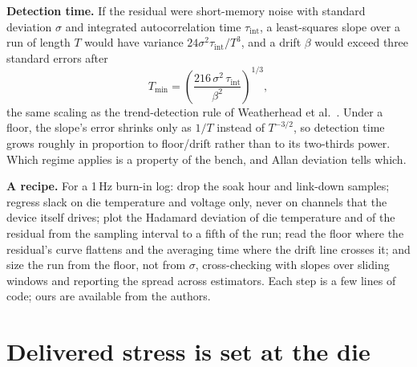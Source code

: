 \documentclass[10pt,twocolumn]{article}
\newcommand{\Tmin}{T_{\min}}
\newcommand{\tint}{\tau_{\mathrm{int}}}
\begin{document}
\textbf{Detection time.} If the residual were short-memory noise with standard deviation $\sigma$ and integrated autocorrelation time $\tint$, a least-squares slope over a run of length $T$ would have variance $24\sigma^2\tint/T^3$, and a drift $\beta$ would exceed three standard errors after
\begin{equation}
\Tmin=\left(\frac{216\,\sigma^2\,\tint}{\beta^2}\right)^{1/3},
\label{eq:tmin}
\end{equation}
the same scaling as the trend-detection rule of Weatherhead et al.~\cite{weatherhead}. Under a floor, the slope's error shrinks only as $1/T$ instead of $T^{-3/2}$, so detection time grows roughly in proportion to floor/drift rather than to its two-thirds power. Which regime applies is a property of the bench, and Allan deviation tells which.

\textbf{A recipe.} For a 1\,Hz burn-in log: drop the soak hour and link-down samples; regress slack on die temperature and voltage only, never on channels that the device itself drives; plot the Hadamard deviation of die temperature and of the residual from the sampling interval to a fifth of the run; read the floor where the residual's curve flattens and the averaging time where the drift line crosses it; and size the run from the floor, not from $\sigma$, cross-checking with slopes over sliding windows and reporting the spread across estimators. Each step is a few lines of code; ours are available from the authors.

\section{Delivered stress is set at the die}
\end{document}
